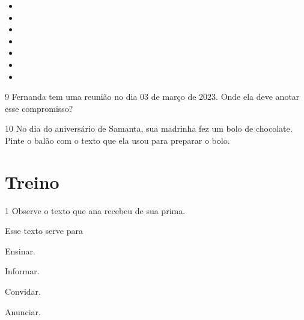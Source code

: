 \begin{itemize}
\item {}

\item \reduline{\mbox{}\hfill}

\item \reduline{\mbox{}\hfill}

\item \reduline{\mbox{}\hfill}

\item \reduline{\mbox{}\hfill}

\item \reduline{\mbox{}\hfill}

\item \reduline{\mbox{}\hfill}
\end{itemize}

\pagebreak
\num{9} Fernanda tem uma reunião no dia 03 de março de 2023. Onde ela
deve anotar esse compromisso?


\num{10} No dia do aniversário de Samanta, sua madrinha fez um bolo de
chocolate. Pinte o balão com o texto que ela usou para preparar o bolo.

\pagebreak
\section*{Treino}

\num{1} Observe o texto que ana recebeu de sua prima.

Esse texto serve para

\begin{escolha}
	\item Ensinar.

	\item Informar.

	\item Convidar.

	\item Anunciar.
\end{escolha}

